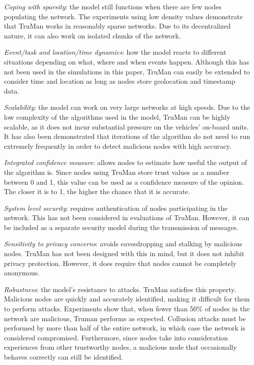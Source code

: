 \documentclass[conference]{IEEEtran}
\begin{document}
\textit{Coping with sparsity}: the model still functions when there are few nodes populating the network.
The experiments using low density values demonstrate that TruMan works in reasonably sparse networks.
Due to its decentralized nature, it can also work on isolated chunks of the network.

\textit{Event/task and location/time dynamics}: how the model reacts to different situations depending on what, where and when events happen.
Although this has not been used in the simulations in this paper, TruMan can easily be extended to consider time and location as long as nodes store geolocation and timestamp data.

\textit{Scalability}: the model can work on very large networks at high speeds.
Due to the low complexity of the algorithms used in the model, TruMan can be highly scalable, as it does not incur substantial pressure on the vehicles' on-board units.
It has also been demonstrated that iterations of the algorithm do not need to run extremely frequently in order to detect malicious nodes with high accuracy.

\textit{Integrated confidence measure}: allows nodes to estimate how useful the output of the algorithm is.
Since nodes using TruMan store trust values as a number between 0 and 1, this value can be used as a confidence measure of the opinion.
The closer it is to 1, the higher the chance that it is accurate.

\textit{System level security}: requires authentication of nodes participating in the network.
This has not been considered in evaluations of TruMan.
However, it can be included as a separate security model during the transmission of messages.

\textit{Sensitivity to privacy concerns}: avoids eavesdropping and stalking by malicious nodes.
TruMan has not been designed with this in mind, but it does not inhibit privacy protection.
However, it does require that nodes cannot be completely anonymous.

\textit{Robustness}: the model's resistance to attacks.
TruMan satisfies this property. Malicious nodes are quickly and accurately identified, making it difficult for them to perform attacks.
Experiments show that, when fewer than 50\% of nodes in the network are malicious, Truman performs as expected.
Collusion attacks must be performed by more than half of the entire network, in which case the network is considered compromised.
Furthermore, since nodes take into consideration experiences from other trustworthy nodes, a malicious node that occasionally behaves correctly can still be identified. 
\end{document}
